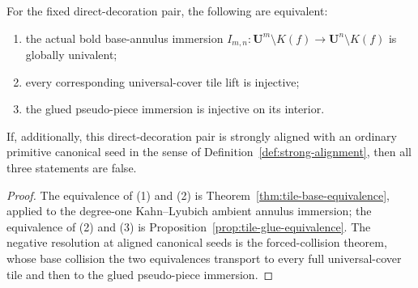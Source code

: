 \begin{corollary}
\label{cor:equivalence-chain}
For the fixed direct-decoration pair, the following are equivalent:
\begin{enumerate}
\item the actual bold base-annulus immersion
      \(I_{m,n}:\mathbf U^{m}\setminus K(f)\to
      \mathbf U^{n}\setminus K(f)\) is globally univalent;
\item every corresponding universal-cover tile lift is injective;
\item the glued pseudo-piece immersion is injective on its
      interior.
\end{enumerate}
If, additionally, this direct-decoration pair is strongly aligned with
an ordinary primitive canonical seed in the sense of
Definition~\ref{def:strong-alignment}, then all three statements are
false.
\end{corollary}

\begin{proof}
The equivalence of (1) and (2) is
Theorem~\ref{thm:tile-base-equivalence}, applied to the degree-one
Kahn--Lyubich ambient annulus immersion; the equivalence of (2) and (3) is
Proposition~\ref{prop:tile-glue-equivalence}.  The negative resolution
at aligned canonical seeds is the forced-collision theorem, whose base
collision the two equivalences transport to every full universal-cover
tile and then to the glued pseudo-piece immersion.
\end{proof}